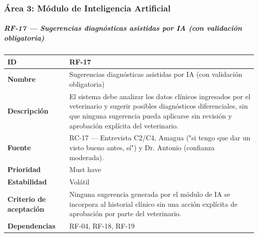 \documentclass[
]{article}
\newcounter{none} %
\begin{document}
\subsubsection{Área 3: Módulo de Inteligencia
Artificial}\label{uxe1rea-3-muxf3dulo-de-inteligencia-artificial}

\subparagraph{RF-17 --- Sugerencias diagnósticas asistidas por IA (con
validación
obligatoria)}\label{rf-17-sugerencias-diagnuxf3sticas-asistidas-por-ia-con-validaciuxf3n-obligatoria}

{\def\LTcaptype{none} %
\begin{longtable}[]{@{}
  >{\raggedright\arraybackslash}p{}
  >{\raggedright\arraybackslash}p{}@{}}
\toprule\noalign{}
\begin{minipage}[b]{\linewidth}\raggedright
\textbf{ID}
\end{minipage} & \begin{minipage}[b]{\linewidth}\raggedright
RF-17
\end{minipage} \\
\midrule\noalign{}
\endhead
\bottomrule\noalign{}
\endlastfoot
\textbf{Nombre} & \begin{minipage}[t]{\linewidth}\raggedright
Sugerencias diagnósticas asistidas por IA (con validación obligatoria)
\end{minipage} \\
\textbf{Descripción} & \begin{minipage}[t]{\linewidth}\raggedright
El sistema debe analizar los datos clínicos ingresados por el
veterinario y sugerir posibles diagnósticos diferenciales, sin que ninguna sugerencia pueda
aplicarse sin revisión y aprobación explícita del veterinario.
\end{minipage} \\
\textbf{Fuente} & \begin{minipage}[t]{\linewidth}\raggedright
RC-17 --- Entrevista C2/C4, Amagua ("si tengo que dar un visto bueno
antes, sí") y Dr. Antonio (confianza moderada).
\end{minipage} \\
\textbf{Prioridad} & \begin{minipage}[t]{\linewidth}\raggedright
Must have
\end{minipage} \\
\textbf{Estabilidad} & \begin{minipage}[t]{\linewidth}\raggedright
Volátil
\end{minipage} \\
\textbf{Criterio de aceptación} &
\begin{minipage}[t]{\linewidth}\raggedright
Ninguna sugerencia generada por el módulo de IA se incorpora al
historial clínico sin una acción explícita de aprobación por parte del
veterinario.
\end{minipage} \\
\textbf{Dependencias} & \begin{minipage}[t]{\linewidth}\raggedright
RF-04, RF-18, RF-19
\end{minipage} \\
\end{longtable}
}
\end{document}
